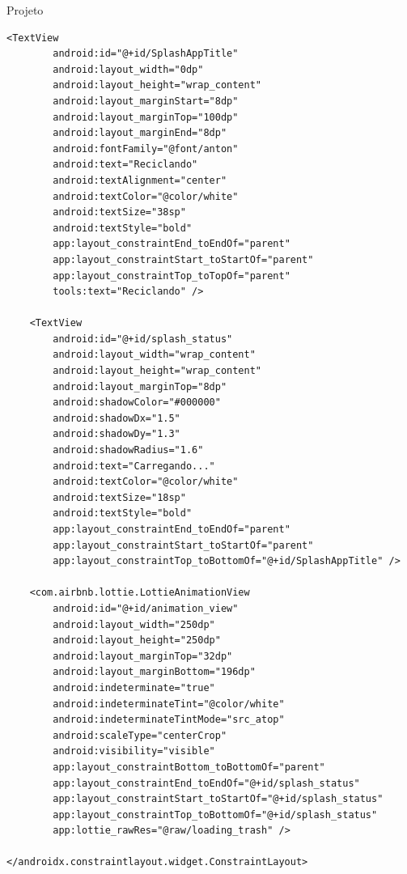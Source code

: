 \documentclass[
	12pt,				%
	openright,			%
	twoside,			%
	a4paper,			%
	english,			%
	french,				%
	spanish,			%
	brazil				%
	]{abntex2}
\begin{document}
\begin{chapter}{Projeto}
\begin{lstlisting}[numbers=none,basicstyle=\small,caption={ActivitySplash.xml}, title={ActivitySplash.xml}, label={activity_splash.xml}]
    <TextView
        android:id="@+id/SplashAppTitle"
        android:layout_width="0dp"
        android:layout_height="wrap_content"
        android:layout_marginStart="8dp"
        android:layout_marginTop="100dp"
        android:layout_marginEnd="8dp"
        android:fontFamily="@font/anton"
        android:text="Reciclando"
        android:textAlignment="center"
        android:textColor="@color/white"
        android:textSize="38sp"
        android:textStyle="bold"
        app:layout_constraintEnd_toEndOf="parent"
        app:layout_constraintStart_toStartOf="parent"
        app:layout_constraintTop_toTopOf="parent"
        tools:text="Reciclando" />

    <TextView
        android:id="@+id/splash_status"
        android:layout_width="wrap_content"
        android:layout_height="wrap_content"
        android:layout_marginTop="8dp"
        android:shadowColor="#000000"
        android:shadowDx="1.5"
        android:shadowDy="1.3"
        android:shadowRadius="1.6"
        android:text="Carregando..."
        android:textColor="@color/white"
        android:textSize="18sp"
        android:textStyle="bold"
        app:layout_constraintEnd_toEndOf="parent"
        app:layout_constraintStart_toStartOf="parent"
        app:layout_constraintTop_toBottomOf="@+id/SplashAppTitle" />

    <com.airbnb.lottie.LottieAnimationView
        android:id="@+id/animation_view"
        android:layout_width="250dp"
        android:layout_height="250dp"
        android:layout_marginTop="32dp"
        android:layout_marginBottom="196dp"
        android:indeterminate="true"
        android:indeterminateTint="@color/white"
        android:indeterminateTintMode="src_atop"
        android:scaleType="centerCrop"
        android:visibility="visible"
        app:layout_constraintBottom_toBottomOf="parent"
        app:layout_constraintEnd_toEndOf="@+id/splash_status"
        app:layout_constraintStart_toStartOf="@+id/splash_status"
        app:layout_constraintTop_toBottomOf="@+id/splash_status"
        app:lottie_rawRes="@raw/loading_trash" />

</androidx.constraintlayout.widget.ConstraintLayout>
\end{lstlisting}

\end{chapter}
\end{document}
